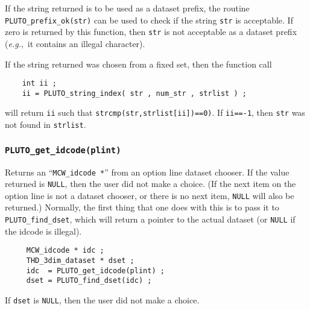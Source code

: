   If the string returned is to be used as a dataset prefix,
  the routine {\tt PLUTO\_prefix\_ok(str)} can be used to check
  if the string {\tt str} is acceptable.  If zero is returned
  by this function, then {\tt str} is not acceptable as a dataset
  prefix ({\it e.g.},~it contains an illegal character).

\vset
  If the string returned was chosen from a fixed set, then
  the function call
\begin{samepage}\begin{verbatim}
    int ii ;
    ii = PLUTO_string_index( str , num_str , strlist ) ;
\end{verbatim}\end{samepage}
  will return {\tt ii} such that {\tt strcmp(str,strlist[ii])==0)}.
  If {\tt ii==-1}, then {\tt str} was not found in {\tt strlist}.

\subsubsection{{\tt PLUTO\_get\_idcode(plint)}}
  Returns an ``{\tt MCW\_idcode *}'' from an option line dataset chooser.
  If the value returned is {\tt NULL}, then the user did not make a
  choice.  (If the next item on the option line is not a dataset chooser,
  or there is no next item, {\tt NULL} will also be returned.)
  Normally, the first thing that one does with
  this is to pass it to {\tt PLUTO\_find\_dset}, which will return
  a pointer to the actual dataset (or {\tt NULL} if the idcode is illegal).

\begin{samepage}\begin{verbatim}
     MCW_idcode * idc ;
     THD_3dim_dataset * dset ;
     idc  = PLUTO_get_idcode(plint) ;
     dset = PLUTO_find_dset(idc) ;
\end{verbatim}\end{samepage}
  If {\tt dset} is {\tt NULL}, then the user did not make a choice.

